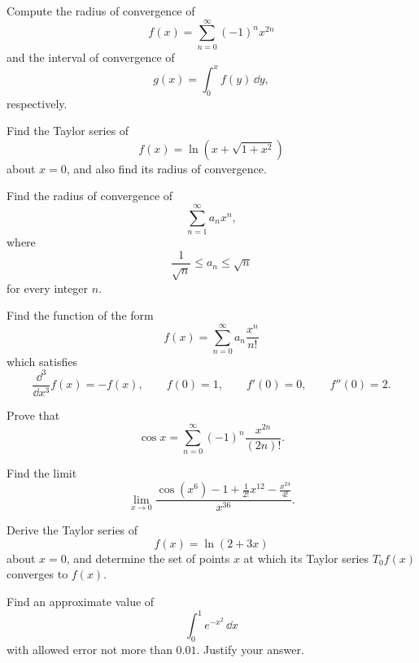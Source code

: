 \begin{problem}
Compute the radius of convergence of
\[
f(x)=\sum_{n=0}^{\infty}(-1)^n x^{2n}
\]
and the interval of convergence of
\[
g(x)=\int_0^x f(y)\,\dd y,
\]
respectively.
\end{problem}

\begin{problem}
Find the Taylor series of
\[
f(x)=\ln\!\left(x+\sqrt{1+x^2}\right)
\]
about $x=0$, and also find its radius of convergence.
\end{problem}

\begin{problem}
Find the radius of convergence of
\[
\sum_{n=1}^{\infty}a_nx^n,
\]
where
\[
\frac{1}{\sqrt n}\le a_n\le\sqrt n
\]
for every integer $n$.
\end{problem}

\begin{problem}
Find the function of the form
\[
f(x)=\sum_{n=0}^{\infty}a_n\frac{x^n}{n!}
\]
which satisfies
\[
\frac{\dd^3}{\dd x^3}f(x)=-f(x),
\qquad
f(0)=1,
\qquad
f'(0)=0,
\qquad
f''(0)=2.
\]
\end{problem}

\begin{problem}
\begin{problemsubparts}
\item Prove that
\[
\cos x=\sum_{n=0}^{\infty}(-1)^n\frac{x^{2n}}{(2n)!}.
\]
\item Find the limit
\[
\lim_{x\to0}
\frac{\cos(x^6)-1+\frac{1}{2!}x^{12}-\frac{x^{24}}{4!}}{x^{36}}.
\]
\end{problemsubparts}
\end{problem}

\begin{problem}
Derive the Taylor series of
\[
f(x)=\ln(2+3x)
\]
about $x=0$, and determine the set of points $x$ at which its Taylor series $T_0f(x)$ converges to $f(x)$.
\end{problem}

\begin{problem}
Find an approximate value of
\[
\int_0^1 e^{-x^2}\,\dd x
\]
with allowed error not more than $0.01$. Justify your answer.
\end{problem}

